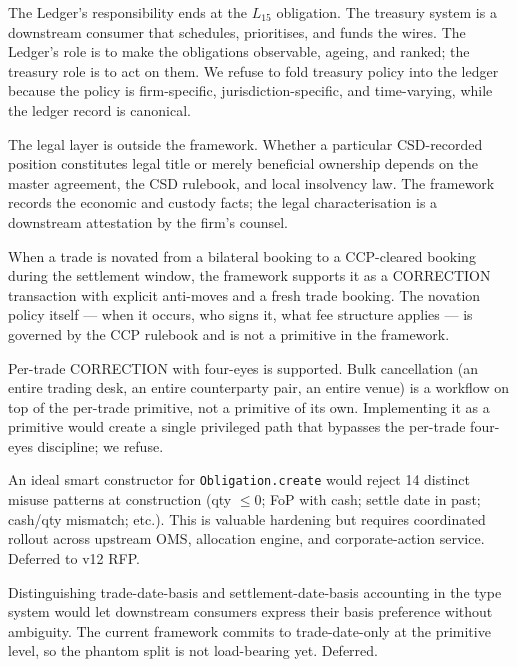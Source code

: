 \documentclass[11pt,a4paper]{article}
\begin{document}
\begin{description}[leftmargin=2em,style=nextline]
\item[Liquidity management of the cash leg] The Ledger's responsibility ends at the $L_{15}$ obligation. The treasury system is a downstream consumer that schedules, prioritises, and funds the wires. The Ledger's role is to make the obligations observable, ageing, and ranked; the treasury role is to act on them. We refuse to fold treasury policy into the ledger because the policy is firm-specific, jurisdiction-specific, and time-varying, while the ledger record is canonical.

\item[Title vs beneficial ownership] The legal layer is outside the framework. Whether a particular CSD-recorded position constitutes legal title or merely beneficial ownership depends on the master agreement, the CSD rulebook, and local insolvency law. The framework records the economic and custody facts; the legal characterisation is a downstream attestation by the firm's counsel.

\item[Cross-CCP novation during the open window] When a trade is novated from a bilateral booking to a CCP-cleared booking during the settlement window, the framework supports it as a CORRECTION transaction with explicit anti-moves and a fresh trade booking. The novation policy itself --- when it occurs, who signs it, what fee structure applies --- is governed by the CCP rulebook and is not a primitive in the framework.

\item[Mass-cancellation events] Per-trade CORRECTION with four-eyes is supported. Bulk cancellation (an entire trading desk, an entire counterparty pair, an entire venue) is a workflow on top of the per-trade primitive, not a primitive of its own. Implementing it as a primitive would create a single privileged path that bypasses the per-trade four-eyes discipline; we refuse.

\item[Smart-constructor 14-rejection cases] An ideal smart constructor for \texttt{Obligation.create} would reject 14 distinct misuse patterns at construction (qty $\leq 0$; FoP with cash; settle date in past; cash/qty mismatch; etc.). This is valuable hardening but requires coordinated rollout across upstream OMS, allocation engine, and corporate-action service. Deferred to v12 RFP.

\item[Phantom-typed accounting basis] Distinguishing trade-date-basis and settlement-date-basis accounting in the type system would let downstream consumers express their basis preference without ambiguity. The current framework commits to trade-date-only at the primitive level, so the phantom split is not load-bearing yet. Deferred.


\end{description}
\end{document}
